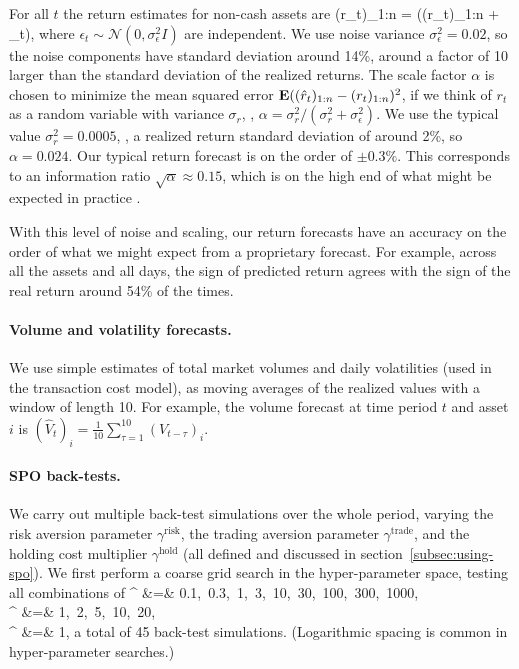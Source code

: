 \documentclass[openany]{article}  %
\renewcommand{\S}{section~}
\begin{document}
For all $t$ the return estimates for non-cash assets are
\BEQ\label{e-SPO-return-forecast}
(\hat r_t)_{1:n} =   \alpha  \left((r_t)_{1:n} + \epsilon_t\right),
\EEQ
where $\epsilon_t \sim \mathcal N(0,\sigma_\epsilon^2 I)$ are independent.
We use noise variance $\sigma^2_\epsilon = 0.02$, so the noise components have
standard deviation around 14\%, around a factor of 10 larger than
the standard deviation of the realized returns.
The scale factor
$\alpha$ is chosen to minimize the mean squared error
$\mathop{\bf E{}} ((\hat r_t)_{1:n} - (r_t)_{1:n})^2$,
if we think of $r_t$ as a random variable with variance $\sigma_r$, \ie,
$\alpha = {\sigma^2_r}/{(\sigma^2_r + \sigma^2_\epsilon)}$.
We use the typical value $\sigma^2_r = 0.0005$, \ie, a
realized return standard deviation of around 2\%,
so $\alpha = 0.024$.  Our typical return forecast is on the order of
$\pm 0.3\%$.
This corresponds to an information ratio $\sqrt \alpha \approx 0.15$,
which is on the high end of what might be
expected in practice \cite{grinold1999active}.

With this level of noise and scaling, our return forecasts have an accuracy
on the order of what we might expect from a proprietary forecast.
For example, across all the assets and all days,
the sign of predicted return
agrees with the sign of the real return around 54\% of the times.

\paragraph{Volume and volatility forecasts.}
We use simple estimates of total market volumes and daily volatilities
(used in the transaction cost model),
as moving averages of the realized values with a window of length 10.
For example, the volume forecast at time period $t$ and asset $i$ is
$
(\hat V_t)_i = \frac{1}{10} \sum_{\tau=1}^{10} (V_{t-\tau})_i
$.

\paragraph{SPO back-tests.}
We carry out multiple back-test simulations over the whole period,
varying the risk aversion parameter
$\gamma^\text{risk}$, the trading
aversion parameter $\gamma^\text{trade}$, and the holding cost
multiplier $\gamma^\text{hold}$
(all defined and discussed in \S\ref{subsec:using-spo}).
We first perform a coarse grid search in the hyper-parameter space,
testing all combinations of
\BEAS
\gamma^ &=& 0.1,~0.3,~1,~3,~10,~30,~100,~300,~1000,\\
\gamma^ &=& 1,~2,~5,~10,~20,\\
\gamma^ &=& 1,
\EEAS
a total of 45 back-test simulations.
(Logarithmic spacing is common in hyper-parameter searches.)
\end{document}
